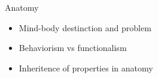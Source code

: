 \begin{frame}{Anatomy}
    \begin{itemize}
        \item Mind-body destinction and problem
        \item Behaviorism vs functionalism
        \item Inheritence of properties in anatomy
    \end{itemize}
\end{frame}